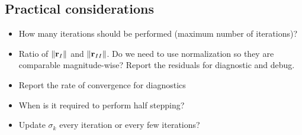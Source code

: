 \documentclass{article}
\begin{document}
\subsection{Practical considerations}
\begin{itemize}
    \item How many iterations should be performed (maximum number of iterations)?
    \item Ratio of $\|{\bf r}_I\|$ and $\|{\bf r}_{II}\|$. Do we need to use normalization so they are comparable magnitude-wise? Report the residuals for diagnostic and debug.
    \item Report the rate of convergence for diagnostics
    \item When is it required to perform half stepping?
    \item Update $\sigma_k$ every iteration or every few iterations?
\end{itemize}

\end{document}
